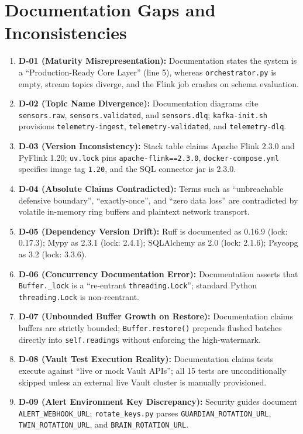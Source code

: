 \documentclass[10pt,a4paper]{report}
\begin{document}
\section{Documentation Gaps and Inconsistencies}
\begin{enumerate}[leftmargin=*]
  \item \textbf{D-01 (Maturity Misrepresentation):} Documentation states the system is a ``Production-Ready Core Layer'' (line 5), whereas \texttt{orchestrator.py} is empty, stream topics diverge, and the Flink job crashes on schema evaluation.
  \item \textbf{D-02 (Topic Name Divergence):} Documentation diagrams cite \texttt{sensors.raw}, \texttt{sensors.validated}, and \texttt{sensors.dlq}; \texttt{kafka-init.sh} provisions \texttt{telemetry-ingest}, \texttt{telemetry-validated}, and \texttt{telemetry-dlq}.
  \item \textbf{D-03 (Version Inconsistency):} Stack table claims Apache Flink 2.3.0 and PyFlink 1.20; \texttt{uv.lock} pins \texttt{apache-flink==2.3.0}, \texttt{docker-compose.yml} specifies image tag \texttt{1.20}, and the SQL connector jar is 2.3.0.
  \item \textbf{D-04 (Absolute Claims Contradicted):} Terms such as ``unbreachable defensive boundary'', ``exactly-once'', and ``zero data loss'' are contradicted by volatile in-memory ring buffers and plaintext network transport.
  \item \textbf{D-05 (Dependency Version Drift):} Ruff is documented as 0.16.9 (lock: 0.17.3); Mypy as 2.3.1 (lock: 2.4.1); SQLAlchemy as 2.0 (lock: 2.1.6); Psycopg as 3.2 (lock: 3.3.6).
  \item \textbf{D-06 (Concurrency Documentation Error):} Documentation asserts that \texttt{Buffer.\_lock} is a ``re-entrant \texttt{threading.Lock}''; standard Python \texttt{threading.Lock} is non-reentrant.
  \item \textbf{D-07 (Unbounded Buffer Growth on Restore):} Documentation claims buffers are strictly bounded; \texttt{Buffer.restore()} prepends flushed batches directly into \texttt{self.readings} without enforcing the high-watermark.
  \item \textbf{D-08 (Vault Test Execution Reality):} Documentation claims tests execute against ``live or mock Vault APIs''; all 15 tests are unconditionally skipped unless an external live Vault cluster is manually provisioned.
  \item \textbf{D-09 (Alert Environment Key Discrepancy):} Security guides document \texttt{ALERT\_WEBHOOK\_URL}; \texttt{rotate\_keys.py} parses \texttt{GUARDIAN\_ROTATION\_URL}, \texttt{TWIN\_ROTATION\_URL}, and \texttt{BRAIN\_ROTATION\_URL}.

\end{enumerate}
\end{document}
